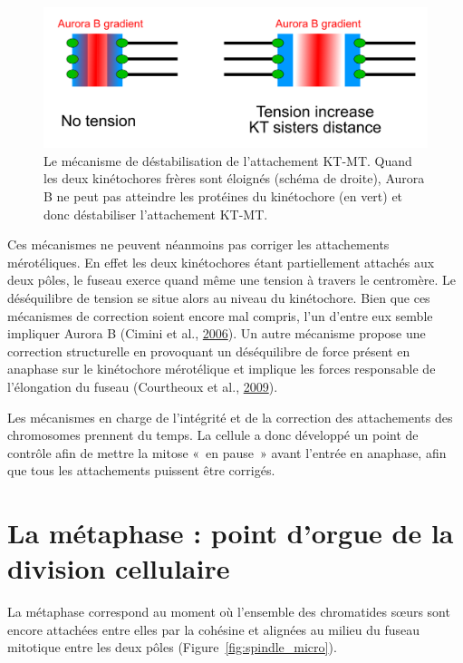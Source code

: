 \documentclass[12pt,a4paper,twoside,openright]{book}
\begin{document}
\begin{figure}[htbp]
\centering
\includegraphics{figures/intro/aurora.png}
\caption{\label{fig:aurora}Le mécanisme de déstabilisation de
l'attachement KT-MT. Quand les deux kinétochores frères sont éloignés
(schéma de droite), Aurora B ne peut pas atteindre les protéines du
kinétochore (en vert) et donc déstabiliser l'attachement KT-MT.}
\end{figure}

Ces mécanismes ne peuvent néanmoins pas corriger les attachements
mérotéliques. En effet les deux kinétochores étant partiellement
attachés aux deux pôles, le fuseau exerce quand même une tension à
travers le centromère. Le déséquilibre de tension se situe alors au
niveau du kinétochore. Bien que ces mécanismes de correction soient
encore mal compris, l'un d'entre eux semble impliquer Aurora B (Cimini
et al., \protect\hyperlink{ref-Cimini2006}{2006}). Un autre mécanisme
propose une correction structurelle en provoquant un déséquilibre de
force présent en anaphase sur le kinétochore mérotélique et implique les
forces responsable de l'élongation du fuseau (Courtheoux et al.,
\protect\hyperlink{ref-Courtheoux2009}{2009}).

Les mécanismes en charge de l'intégrité et de la correction des
attachements des chromosomes prennent du temps. La cellule a donc
développé un point de contrôle afin de mettre la mitose «~en pause~»
avant l'entrée en anaphase, afin que tous les attachements puissent être
corrigés.

\section{La métaphase : point d'orgue de la division
cellulaire}\label{la-muxe9taphase-point-dorgue-de-la-division-cellulaire}

La métaphase correspond au moment où l'ensemble des chromatides sœurs
sont encore attachées entre elles par la cohésine et alignées au milieu
du fuseau mitotique entre les deux pôles
(Figure~\ref{fig:spindle_micro}).
\end{document}
